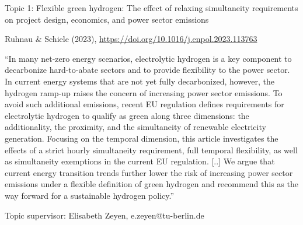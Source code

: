 \documentclass[10pt,aspectratio=169,dvipsnames]{beamer}
\begin{document}
\begin{frame}
  \begin{block}{Topic 1: Flexible green hydrogen: The effect of relaxing simultaneity requirements on project design, economics, and power sector emissions}
      
    Ruhnau \& Schiele (2023), \href{https://doi.org/10.1016/j.enpol.2023.113763}{https://doi.org/10.1016/j.enpol.2023.113763}
    
    \enquote{In many net-zero energy scenarios, electrolytic hydrogen is a key component to decarbonize hard-to-abate sectors and to provide flexibility to the power sector. In current energy systems that are not yet fully decarbonized, however, the hydrogen ramp-up raises the concern of increasing power sector emissions. To avoid such additional emissions, recent EU regulation defines requirements for electrolytic hydrogen to qualify as green along three dimensions: the additionality, the proximity, and the simultaneity of renewable electricity generation. Focusing on the temporal dimension, this article investigates the effects of a strict hourly simultaneity requirement, full temporal flexibility, as well as simultaneity exemptions in the current EU regulation. [..] We argue that current energy transition trends further lower the risk of increasing power sector emissions under a flexible definition of green hydrogen and recommend this as the way forward for a sustainable hydrogen policy.} 
  
    \hfill
    Topic supervisor: Elisabeth Zeyen, e.zeyen@tu-berlin.de
    
  \end{block}
\end{frame}
\end{document}
